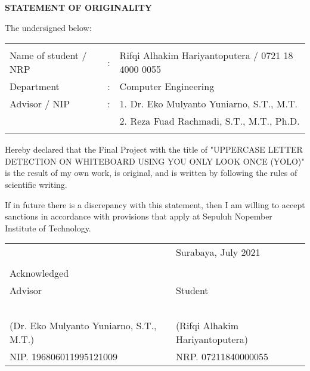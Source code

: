 \begin{center}
  \large
  \textbf{STATEMENT OF ORIGINALITY}
\end{center}

\thispagestyle{empty}

\vspace{2ex}


\noindent The undersigned below:

\noindent\begin{tabularx}{\textwidth}{X l l}
  & & \\
  Name of student / NRP &: & Rifqi Alhakim Hariyantoputera / 0721 18 4000 0055 \\
  Department &: & Computer Engineering \\
  Advisor / NIP &: & 1. Dr. Eko Mulyanto Yuniarno, S.T., M.T. \\
  & & 2. Reza Fuad Rachmadi, S.T., M.T., Ph.D. \\
  & & \\
\end{tabularx}

Hereby declared that the Final Project with the title of "UPPERCASE LETTER DETECTION ON WHITEBOARD USING YOU ONLY LOOK ONCE (YOLO)" is the result of my own work, is original, and is written by following the rules of scientific writing.

If in future there is a discrepancy with this statement, then I am willing to accept sanctions in accordance with provisions that apply at Sepuluh Nopember Institute of Technology.

\vspace{8ex}

\noindent\begin{tabularx}{\textwidth}{X l}
  & Surabaya, July 2021\\
  & \\
  Acknowledged & \\
  Advisor & Student\\
  & \\
  & \\
  & \\
  & \\
  & \\
  (Dr. Eko Mulyanto Yuniarno, S.T., M.T.) & (Rifqi Alhakim Hariyantoputera) \\
  NIP. 196806011995121009 & NRP. 07211840000055\\
\end{tabularx}